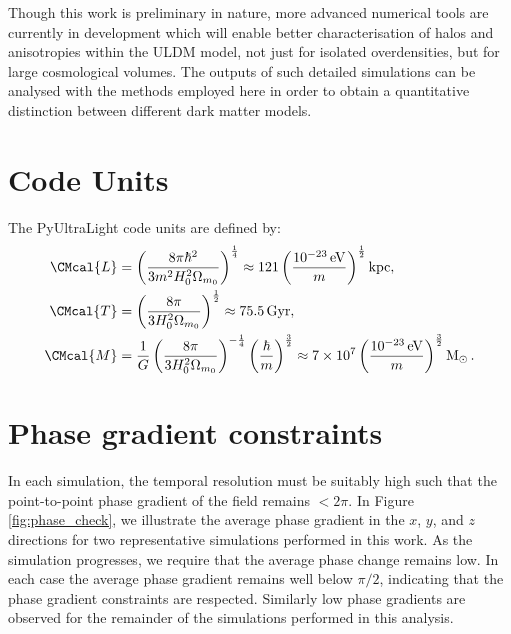 \documentclass[a4paper,11pt]{article}
\begin{document}
Though this work is preliminary in nature, more advanced numerical tools are currently in development which will enable better characterisation of halos and anisotropies within the ULDM model, not just for isolated overdensities, but for large cosmological volumes. The outputs of such detailed simulations can be analysed with the methods employed here in order to obtain a quantitative distinction between different dark matter models. 











\appendix


\section{Code Units}\label{app:units}

The {\sc PyUltraLight} code units are defined by:
\begin{align}
    \CMcal{L}&=\left(\frac{8\pi\hbar^2}{3 m^2H_0^2\Omega_{m_0}}\right)^{\frac{1}{4}}\approx121\left(\frac{10^{-23}\operatorname{eV}}{m}\right)^{\frac{1}{2}}\operatorname{kpc},\label{eq:length}\\
    \CMcal{T}&=\left(\frac{8\pi}{3 H_0^2\Omega_{m_0}}\right)^{\frac{1}{2}}\approx75.5 \operatorname{Gyr},\label{eq:time}\\
    \CMcal{M}&=\frac{1}{G}\left(\frac{8\pi}{3 H_0^2\Omega_{m_0}}\right)^{-\frac{1}{4}}\left(\frac{\hbar}{m}\right)^{\frac{3}{2}}\approx 7\times 10^7\left(\frac{10^{-23}\operatorname{eV}}{m}\right)^{\frac{3}{2}}\operatorname{M}_{\odot}.\label{eq:mass}
\end{align}

\section{Phase gradient constraints}\label{app:phase_check}

In each simulation, the temporal resolution must be suitably high such that the point-to-point phase gradient of the field remains $<2\pi$. In Figure \ref{fig:phase_check}, we illustrate the average phase gradient in the $x$, $y$, and $z$ directions for two representative simulations performed in this work. As the simulation progresses, we require that the average phase change remains low. In each case the average phase gradient remains well below $\pi / 2$, indicating that the phase gradient constraints are respected. Similarly low phase gradients are observed for the remainder of the simulations performed in this analysis.
\end{document}
